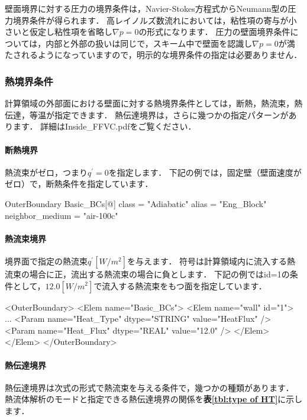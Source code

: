 壁面境界に対する圧力の境界条件は，Navier-Stokes方程式からNeumann型の圧力境界条件が得られます．
高レイノルズ数流れにおいては，粘性項の寄与が小さいと仮定し粘性項を省略し$\nabla p=0$の形式になります．
圧力の壁面境界条件については，内部と外部の扱いは同じで，スキーム中で壁面を認識し$\nabla p=0$が満たされるようになっていますので，明示的な境界条件の指定は必要ありません．

%
\subsubsection{熱境界条件}
計算領域の外部面における壁面に対する熱境界条件としては，断熱，熱流束，熱伝達，等温が指定できます．
熱伝達境界は，さらに幾つかの指定パターンがあります．
詳細はInside\_FFVC.pdfをご覧ください．

%
\paragraph{断熱境界}
熱流束がゼロ，つまり$q^{\prime}=0$を指定します．
下記の例では，固定壁（壁面速度がゼロ）で，断熱条件を指定しています．

{\small
\begin{program}
OuterBoundary {
    Basic_BCs[@] {
      class                    = "Adiabatic"
      alias                    = "Eng_Block"
      neighbor_medium          = "air-100c"
    }
}
\end{program}
}

%
\paragraph{熱流束境界}
境界面で指定の熱流束$q^{\prime}[W/m^2]$を与えます．
符号は計算領域内に流入する熱流束の場合に正，流出する熱流束の場合に負とします．
下記の例ではid=1の条件として，$12.0[W/m^2]$で流入する熱流束をもつ面を指定しています．

{\small
\begin{program}
<OuterBoundary>
  <Elem name="Basic_BCs">
    <Elem name="wall" id="1">
      ...
      <Param name="Heat_Type"       dtype="STRING" value="HeatFlux" />
      <Param name="Heat_Flux"       dtype="REAL"   value="12.0" />
    </Elem>
  </Elem>
</OuterBoundary>
\end{program}
}


%
\hypertarget{tgt:heat-transfer}{\paragraph{熱伝達境界}}
熱伝達境界は次式の形式で熱流束を与える条件で，幾つかの種類があります．
熱流体解析のモードと指定できる熱伝達境界の関係を\textbf{表\ref{tbl:type of HT}}に示します．

